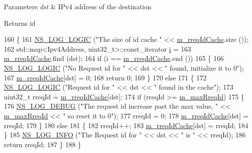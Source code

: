 \begin{DoxyParams}{Parameters}
{\em dst} & I\+Pv4 address of the destination \\
\hline
\end{DoxyParams}
\begin{DoxyReturn}{Returns}
id 
\end{DoxyReturn}

\begin{DoxyCode}
160 \{
161   \hyperlink{group__logging_ga88acd260151caf2db9c0fc84997f45ce}{NS\_LOG\_LOGIC} (\textcolor{stringliteral}{"The size of id cache "} << \hyperlink{classns3_1_1dsr_1_1DsrRreqTable_a320d3d557c1ea9963868fb9d2efbe3a5}{m\_rreqIdCache}.size ());
162   std::map<Ipv4Address, uint32\_t>::const\_iterator \hyperlink{bernuolliDistribution_8m_a6f6ccfcf58b31cb6412107d9d5281426}{i} =
163     \hyperlink{classns3_1_1dsr_1_1DsrRreqTable_a320d3d557c1ea9963868fb9d2efbe3a5}{m\_rreqIdCache}.find (dst);
164   \textcolor{keywordflow}{if} (i == \hyperlink{classns3_1_1dsr_1_1DsrRreqTable_a320d3d557c1ea9963868fb9d2efbe3a5}{m\_rreqIdCache}.end ())
165     \{
166       \hyperlink{group__logging_ga88acd260151caf2db9c0fc84997f45ce}{NS\_LOG\_LOGIC} (\textcolor{stringliteral}{"No Request id for "} << dst << \textcolor{stringliteral}{" found, initialize it to 0"});
167       \hyperlink{classns3_1_1dsr_1_1DsrRreqTable_a320d3d557c1ea9963868fb9d2efbe3a5}{m\_rreqIdCache}[dst] = 0;
168       \textcolor{keywordflow}{return} 0;
169     \}
170   \textcolor{keywordflow}{else}
171     \{
172       \hyperlink{group__logging_ga88acd260151caf2db9c0fc84997f45ce}{NS\_LOG\_LOGIC} (\textcolor{stringliteral}{"Request id for "} << dst << \textcolor{stringliteral}{" found in the cache"});
173       uint32\_t rreqId = \hyperlink{classns3_1_1dsr_1_1DsrRreqTable_a320d3d557c1ea9963868fb9d2efbe3a5}{m\_rreqIdCache}[dst];
174       \textcolor{keywordflow}{if} (rreqId >= \hyperlink{classns3_1_1dsr_1_1DsrRreqTable_a8f382a2a8f2b211480187ea2520dc936}{m\_maxRreqId})
175         \{
176           \hyperlink{group__logging_ga413f1886406d49f59a6a0a89b77b4d0a}{NS\_LOG\_DEBUG} (\textcolor{stringliteral}{"The request id increase past the max value, "} << 
      \hyperlink{classns3_1_1dsr_1_1DsrRreqTable_a8f382a2a8f2b211480187ea2520dc936}{m\_maxRreqId} << \textcolor{stringliteral}{" so reset it to 0"});
177           rreqId = 0;
178           \hyperlink{classns3_1_1dsr_1_1DsrRreqTable_a320d3d557c1ea9963868fb9d2efbe3a5}{m\_rreqIdCache}[dst] = rreqId;
179         \}
180       \textcolor{keywordflow}{else}
181         \{
182           rreqId++;
183           \hyperlink{classns3_1_1dsr_1_1DsrRreqTable_a320d3d557c1ea9963868fb9d2efbe3a5}{m\_rreqIdCache}[dst] = rreqId;
184         \}
185       \hyperlink{group__logging_gafbd73ee2cf9f26b319f49086d8e860fb}{NS\_LOG\_INFO} (\textcolor{stringliteral}{"The Request id for "} << dst << \textcolor{stringliteral}{" is "} << rreqId);
186       \textcolor{keywordflow}{return} rreqId;
187     \}
188 \}
\end{DoxyCode}
